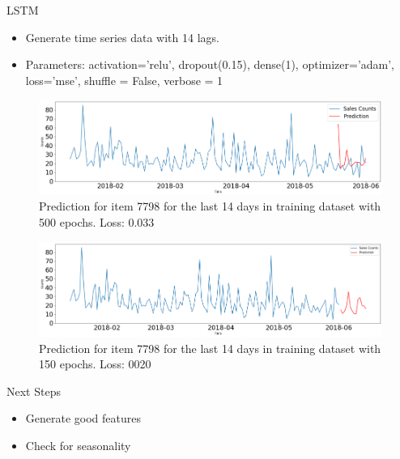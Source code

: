 \documentclass[10pt, xcolor=dvipsnames]{beamer}
\begin{document}
\begin{frame}{LSTM}
\begin{footnotesize}
\begin{itemize}
	\item Generate time series data with 14 lags.
	\item Parameters: activation='relu', dropout(0.15), dense(1), optimizer='adam', loss='mse', shuffle = False, verbose = 1
\end{itemize}
\end{footnotesize}
\begin{figure}
\includegraphics[width=.8\textwidth]{lstm1.png}
\vspace{-12px}
\caption{\tiny Prediction for item 7798 for the last 14 days in training dataset with 500 epochs. Loss: 0.033}
\end{figure}
\vspace{-18px}
\begin{figure}
\includegraphics[width=.8\textwidth]{lstm2.png}
\vspace{-12px}
\caption{\tiny Prediction for item 7798 for the last 14 days in training dataset with 150 epochs. Loss: 0020}
\end{figure}

\end{frame}


\begin{frame}{Next Steps}
        \begin{itemize}
         \item Generate good features
         \item Check for seasonality
        \end{itemize}
\end{frame}
\end{document}
